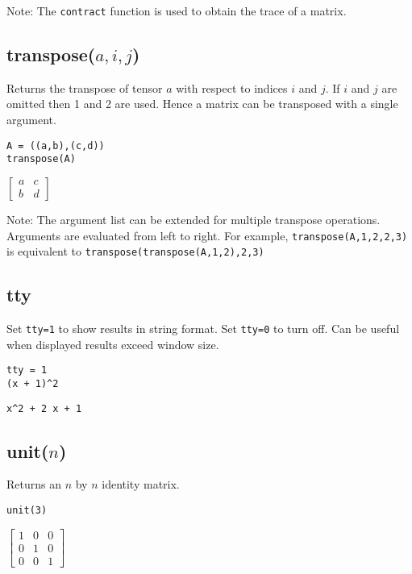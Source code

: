 \documentclass[12pt]{article}
\begin{document}
\noindent
Note:
The
\verb$contract$
function is used to obtain the trace of a matrix.

\subsection*{transpose($a,i,j$)}

Returns the transpose of tensor $a$ with respect to indices $i$ and $j$.
If $i$ and $j$ are omitted then 1 and 2 are used.
Hence a matrix can be transposed with a single argument.

{\color{blue}
\begin{verbatim}
A = ((a,b),(c,d))
transpose(A)
\end{verbatim}
}

\noindent
$\displaystyle
\begin{bmatrix}
a & c
\\[1ex]
b & d
\end{bmatrix}
$

\bigskip
\noindent
Note:
The argument list can be extended for multiple transpose operations.
Arguments are evaluated from left to right.
For example,
\verb$transpose(A,1,2,2,3)$
is equivalent to
\verb$transpose(transpose(A,1,2),2,3)$

\subsection*{tty}

Set \verb$tty=1$ to show results in string format.
Set \verb$tty=0$ to turn off.
Can be useful when displayed results exceed window size.

{\color{blue}
\begin{verbatim}
tty = 1
(x + 1)^2
\end{verbatim}
}

\noindent
\verb$x^2 + 2 x + 1$

\subsection*{unit($n$)}

Returns an $n$ by $n$ identity matrix.

{\color{blue}
\begin{verbatim}
unit(3)
\end{verbatim}
}

\noindent
$\displaystyle
\begin{bmatrix}
1 & 0 & 0
\\[1ex]
0 & 1 & 0
\\[1ex]
0 & 0 & 1
\end{bmatrix}
$
\end{document}
